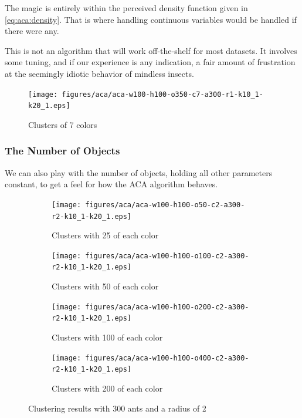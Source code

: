 \documentclass[12pt]{article}
\begin{document}
The magic is entirely within the perceived density function given in \autoref{eq:aca:density}.
That is where handling continuous variables would be handled if there were any.

This is not an algorithm that will work off-the-shelf for most datasets.
It involves some tuning, and if our experience is any indication, a fair amount of frustration at the seemingly idiotic behavior of mindless insects.

\begin{figure}
    \centering
    \texttt{[image: figures/aca/aca-w100-h100-o350-c7-a300-r1-k10\_1-k20\_1.eps]}
    \caption{Clusters of 7 colors}\label{fig:aca:colors-7}
\end{figure}
\subsubsection{The Number of Objects}
We can also play with the number of objects, holding all other parameters constant, to get a feel for how the ACA algorithm behaves.

\begin{figure}[H]
    \centering
    \begin{subfigure}[t]{0.4\textwidth}
        \centering
        \texttt{[image: figures/aca/aca-w100-h100-o50-c2-a300-r2-k10\_1-k20\_1.eps]}
        \caption{Clusters with 25 of each color}\label{fig:aca:numbers-25}
    \end{subfigure}%
    \begin{subfigure}[t]{0.4\textwidth}
        \centering
        \texttt{[image: figures/aca/aca-w100-h100-o100-c2-a300-r2-k10\_1-k20\_1.eps]}
        \caption{Clusters with 50 of each color}\label{fig:aca:numbers-50}
    \end{subfigure}%

    \begin{subfigure}[b]{0.4\textwidth}
        \centering
        \texttt{[image: figures/aca/aca-w100-h100-o200-c2-a300-r2-k10\_1-k20\_1.eps]}
        \caption{Clusters with 100 of each color}\label{fig:aca:numbers-100}
    \end{subfigure}%
    \begin{subfigure}[b]{0.4\textwidth}
        \centering
        \texttt{[image: figures/aca/aca-w100-h100-o400-c2-a300-r2-k10\_1-k20\_1.eps]}
        \caption{Clusters with 200 of each color}\label{fig:aca:numbers-200}
    \end{subfigure}
    \caption{Clustering results with 300 ants and a radius of 2}\label{fig:aca:numbers}
\end{figure}
\end{document}

